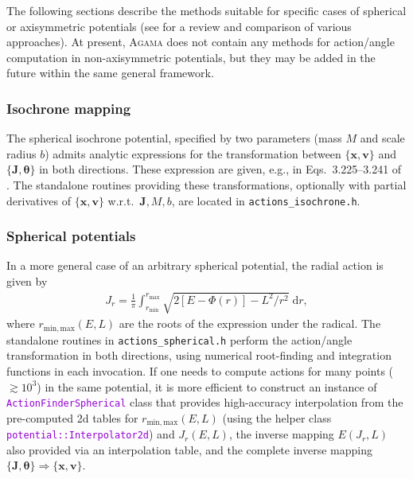 \documentclass[12pt]{article}
\newcommand{\Agama}{\textsc{Agama}\xspace}
\newcommand{\ttt}[1]{\textcolor{darkviolet}{\texttt{#1}}}
\renewcommand{\d}{\mathrm{d}}
\newcommand{\bv}{\boldsymbol{v}}
\newcommand{\bx}{\boldsymbol{x}}
\newcommand{\bJ}{\boldsymbol{J}}
\newcommand{\bt}{\boldsymbol{\theta}}
\begin{document}
The following sections describe the methods suitable for specific cases of spherical or axisymmetric potentials (see \cite{SandersBinney2016} for a review and comparison of various approaches).
At present, \Agama does not contain any methods for action/angle computation in non\--axi\-sym\-met\-ric potentials, but they may be added in the future within the same general framework.


\subsubsection{Isochrone mapping}  \label{sec:ActionsIsochrone}

The spherical isochrone potential, specified by two parameters (mass $M$ and scale radius $b$) admits analytic expressions for the transformation between $\{\bx,\bv\}$ and $\{\bJ,\bt\}$ in both directions. These expression are given, e.g., in Eqs.~3.225--3.241 of \cite{BinneyTremaine}.
The standalone routines providing these transformations, optionally with partial derivatives of $\{\bx,\bv\}$ w.r.t.\ $\bJ, M, b$, are located in \texttt{actions_isochrone.h}.


\subsubsection{Spherical potentials}  \label{sec:ActionsSpherical}

In a more general case of an arbitrary spherical potential, the radial action is given by 
\begin{align*}
J_r = \frac{1}{\pi} \int_{r_\mathrm{min}}^{r_\mathrm{max}} \sqrt{2[E-\Phi(r)] - L^2/r^2}\;\d r,
\end{align*}
where $r_\mathrm{min,max}(E,L)$ are the roots of the expression under the radical.
The standalone routines in \texttt{actions_spherical.h} perform the action/angle transformation in both directions, using numerical root-finding and integration functions in each invocation. If one needs to compute actions for many points ($\gtrsim 10^3$) in the same potential, it is more efficient to construct an instance of \ttt{ActionFinderSpherical} class that provides high-accuracy interpolation from the pre-computed 2d tables for $r_\mathrm{min,max}(E,L)$ (using the helper class \ttt{potential::Interpolator2d}) and $J_r(E,L)$, the inverse mapping $E(J_r,L)$ also provided via an interpolation table, and the complete inverse mapping $\{\bJ,\bt\} \Rightarrow \{\bx,\bv\}$.


\end{document}

